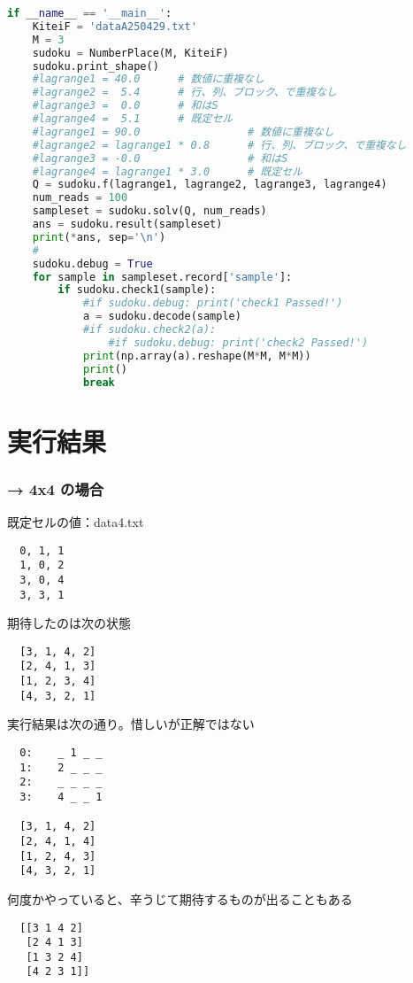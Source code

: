 \documentclass[uplatex,dvipdfmx,a4paper,11pt,oneside,openany]{jsbook}
\begin{document}
\begin{lstlisting}[language=Python]
if __name__ == '__main__':
    KiteiF = 'dataA250429.txt'
    M = 3
    sudoku = NumberPlace(M, KiteiF)
    sudoku.print_shape()
    #lagrange1 = 40.0      # 数値に重複なし
    #lagrange2 =  5.4      # 行、列、ブロック、で重複なし
    #lagrange3 =  0.0      # 和はS
    #lagrange4 =  5.1      # 既定セル
    #lagrange1 = 90.0                 # 数値に重複なし
    #lagrange2 = lagrange1 * 0.8      # 行、列、ブロック、で重複なし
    #lagrange3 = -0.0                 # 和はS
    #lagrange4 = lagrange1 * 3.0      # 既定セル
    Q = sudoku.f(lagrange1, lagrange2, lagrange3, lagrange4)
    num_reads = 100
    sampleset = sudoku.solv(Q, num_reads)
    ans = sudoku.result(sampleset)
    print(*ans, sep='\n')
    #
    sudoku.debug = True
    for sample in sampleset.record['sample']:
        if sudoku.check1(sample):
            #if sudoku.debug: print('check1 Passed!')
            a = sudoku.decode(sample)
            #if sudoku.check2(a):
                #if sudoku.debug: print('check2 Passed!')
            print(np.array(a).reshape(M*M, M*M))
            print()
            break
\end{lstlisting}


\section{実行結果}

\subsubsection{→ 4x4 の場合}

既定セルの値：data4.txt
\begin{verbatim}
  0, 1, 1
  1, 0, 2
  3, 0, 4
  3, 3, 1
\end{verbatim}

期待したのは次の状態
\begin{verbatim}
  [3, 1, 4, 2]
  [2, 4, 1, 3]
  [1, 2, 3, 4]
  [4, 3, 2, 1]
\end{verbatim}

実行結果は次の通り。惜しいが正解ではない
\begin{verbatim}
  0:	_ 1 _ _
  1:	2 _ _ _
  2:	_ _ _ _
  3:	4 _ _ 1

  [3, 1, 4, 2]
  [2, 4, 1, 4]
  [1, 2, 4, 3]
  [4, 3, 2, 1]
\end{verbatim}

何度かやっていると、辛うじて期待するものが出ることもある
\begin{verbatim}
  [[3 1 4 2]
   [2 4 1 3]
   [1 3 2 4]
   [4 2 3 1]]
\end{verbatim}
\end{document}
